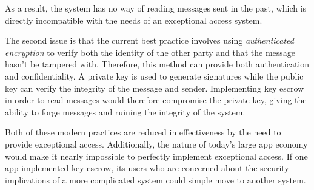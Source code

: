 \documentclass[12pt]{turabian-researchpaper}
\begin{document}
As a result, the system has no way of reading messages sent in the past, which is directly incompatible with the needs of an exceptional access system.

The second issue is that the current best practice involves using \textit{authenticated encryption} to verify both the identity of the other party and that the message hasn't be tampered with.
Therefore, this method can provide both authentication and confidentiality.
A private key is used to generate signatures while the public key can verify the integrity of the message and sender.
Implementing key escrow in order to read messages would therefore compromise the private key, giving the ability to forge messages and ruining the integrity of the system.

Both of these modern practices are reduced in effectiveness by the need to provide exceptional access.
Additionally, the nature of today's large app economy would make it nearly impossible to perfectly implement exceptional access.
If one app implemented key escrow, its users who are concerned about the security implications of a more complicated system could simple move to another system.



\pagebreak

\theendnotes

\printbibliography
\end{document}
